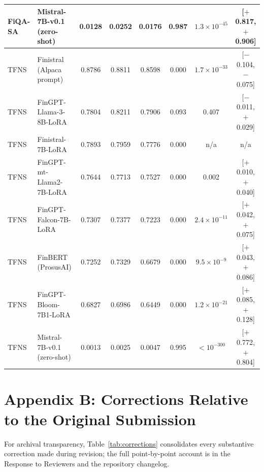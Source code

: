 \documentclass[a4paper]{article}
\begin{document}
\begin{table}[htbp]
{\begin{tabular}{llcccccc}
FiQA-SA & Mistral-7B-v0.1 (zero-shot) & 0.0128 & 0.0252 & 0.0176 & 0.987 & $1.3\times10^{-45}$ & [$+$0.817, $+$0.906] \\
\midrule
TFNS & Finistral (Alpaca prompt) & 0.8786 & 0.8811 & 0.8598 & 0.000 & $1.7\times10^{-33}$ & [$-$0.104, $-$0.075] \\
TFNS & FinGPT-Llama-3-8B-LoRA & 0.7804 & 0.8211 & 0.7906 & 0.093 & 0.407 & [$-$0.011, $+$0.029] \\
TFNS & Finistral-7B-LoRA & 0.7893 & 0.7959 & 0.7776 & 0.000 & n/a & n/a \\
TFNS & FinGPT-mt-Llama2-7B-LoRA & 0.7644 & 0.7713 & 0.7527 & 0.000 & 0.002 & [$+$0.010, $+$0.040] \\
TFNS & FinGPT-Falcon-7B-LoRA & 0.7307 & 0.7377 & 0.7223 & 0.000 & $2.4\times10^{-11}$ & [$+$0.042, $+$0.075] \\
TFNS & FinBERT (ProsusAI) & 0.7252 & 0.7329 & 0.6679 & 0.000 & $9.5\times10^{-9}$ & [$+$0.043, $+$0.086] \\
TFNS & FinGPT-Bloom-7B1-LoRA & 0.6827 & 0.6986 & 0.6449 & 0.000 & $1.2\times10^{-21}$ & [$+$0.085, $+$0.128] \\
TFNS & Mistral-7B-v0.1 (zero-shot) & 0.0013 & 0.0025 & 0.0047 & 0.995 & $<10^{-300}$ & [$+$0.772, $+$0.804] \\
\bottomrule
\end{tabular}}
\end{table}

\section*{Appendix B: Corrections Relative to the Original Submission}
\label{app:corrections}

For archival transparency, Table~\ref{tab:corrections} consolidates every substantive correction made during revision; the full point-by-point account is in the Response to Reviewers and the repository changelog.
\end{document}
